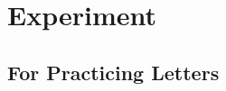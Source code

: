 \chapter{Experiment}

\section{For Practicing Letters}

\makeatletter

\def\lowercase@roman#1{\expandafter\lowercase\expandafter{\expandafter\romannumeral#1\relax}}
\def\uppercase@roman#1{\expandafter\uppercase\expandafter{\expandafter\romannumeral#1\relax}}
\let\LowercaseRoman\lowercase@roman
\let\UppercaseRoman\uppercase@roman

\makeatother